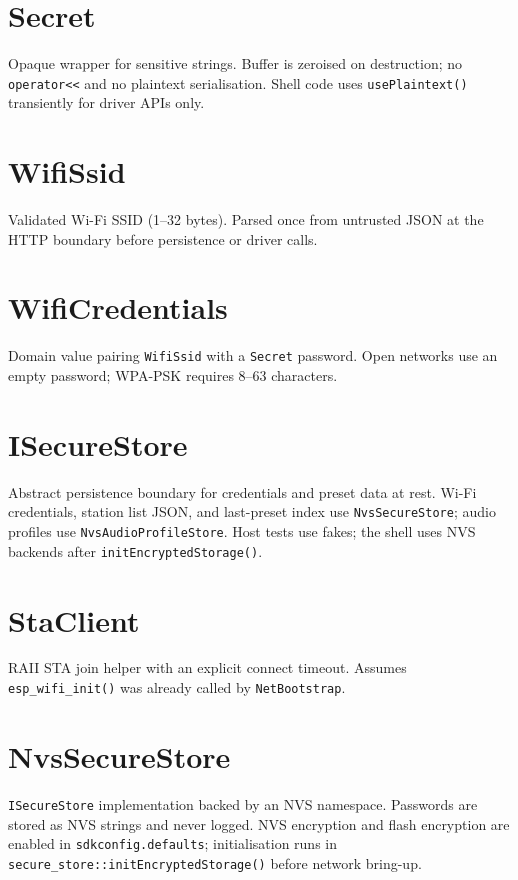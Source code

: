 
\section{Secret}\label{cls:Secret}
Opaque wrapper for sensitive strings. Buffer is zeroised on destruction;
no \texttt{operator<<} and no plaintext serialisation. Shell code uses
\texttt{usePlaintext()} transiently for driver APIs only.

\section{WifiSsid}\label{cls:WifiSsid}
Validated Wi-Fi SSID (1--32 bytes). Parsed once from untrusted JSON at
the HTTP boundary before persistence or driver calls.

\section{WifiCredentials}\label{cls:WifiCredentials}
Domain value pairing \texttt{WifiSsid} with a \texttt{Secret} password.
Open networks use an empty password; WPA-PSK requires 8--63 characters.

\section{ISecureStore}\label{cls:ISecureStore}
Abstract persistence boundary for credentials and preset data at rest.
Wi-Fi credentials, station list JSON, and last-preset index use
\texttt{NvsSecureStore}; audio profiles use \texttt{NvsAudioProfileStore}.
Host tests use fakes; the shell uses NVS backends after
\texttt{initEncryptedStorage()}.

\section{StaClient}\label{cls:StaClient}
RAII STA join helper with an explicit connect timeout. Assumes
\texttt{esp\_wifi\_init()} was already called by \texttt{NetBootstrap}.

\section{NvsSecureStore}\label{cls:NvsSecureStore}
\texttt{ISecureStore} implementation backed by an NVS namespace. Passwords
are stored as NVS strings and never logged. NVS encryption and flash
encryption are enabled in \texttt{sdkconfig.defaults}; initialisation runs in
\texttt{secure\_store::initEncryptedStorage()} before network bring-up.

